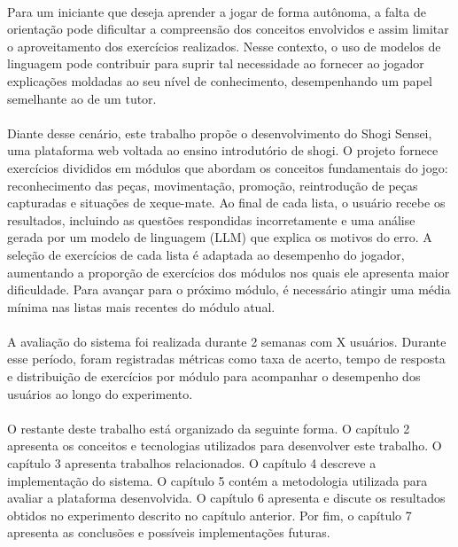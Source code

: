 \documentclass[a4paper, 11pt]{article}
\begin{document}
    \paragraph{}
    Para um iniciante que deseja aprender a jogar de forma autônoma, a falta de orientação pode dificultar
    a compreensão dos conceitos envolvidos e assim limitar o aproveitamento dos exercícios realizados. 
    Nesse contexto, o uso de modelos de linguagem pode contribuir para suprir tal necessidade ao fornecer ao jogador explicações
    moldadas ao seu nível de conhecimento, desempenhando um papel semelhante ao de um tutor. 
    \paragraph{}
    Diante desse cenário, este trabalho propõe o desenvolvimento do Shogi Sensei, uma plataforma web voltada ao ensino
    introdutório de shogi. O projeto fornece exercícios divididos em módulos que abordam os conceitos fundamentais
    do jogo: reconhecimento das peças, movimentação, promoção, reintrodução de peças capturadas e situações de 
    xeque-mate.
    Ao final de cada lista, o usuário recebe os resultados, incluindo as questões respondidas incorretamente e uma análise
    gerada por um modelo de linguagem (LLM) que explica os motivos do erro. A seleção de exercícios de cada lista é adaptada
    ao desempenho do jogador, aumentando a proporção de exercícios dos módulos nos quais ele apresenta maior dificuldade.
    Para avançar para o próximo módulo, é necessário atingir uma média mínima nas listas mais recentes do módulo atual.
    \paragraph{}
    A avaliação do sistema foi realizada durante 2 semanas com X usuários. Durante esse período, 
    foram registradas métricas como taxa de acerto, tempo de resposta e distribuição de exercícios por módulo para
    acompanhar o desempenho dos usuários ao longo do experimento.
    \paragraph{}
    O restante deste trabalho está organizado da seguinte forma. O capítulo 2 apresenta os conceitos e tecnologias
    utilizados para desenvolver este trabalho. O capítulo 3 apresenta trabalhos relacionados. O capítulo 4 descreve a implementação
    do sistema. O capítulo 5 contém a metodologia utilizada para avaliar a plataforma desenvolvida. O capítulo 6 
    apresenta e discute os resultados obtidos no experimento descrito no capítulo anterior. Por fim, o capítulo 7
    apresenta as conclusões e possíveis implementações futuras. 
\end{document}

